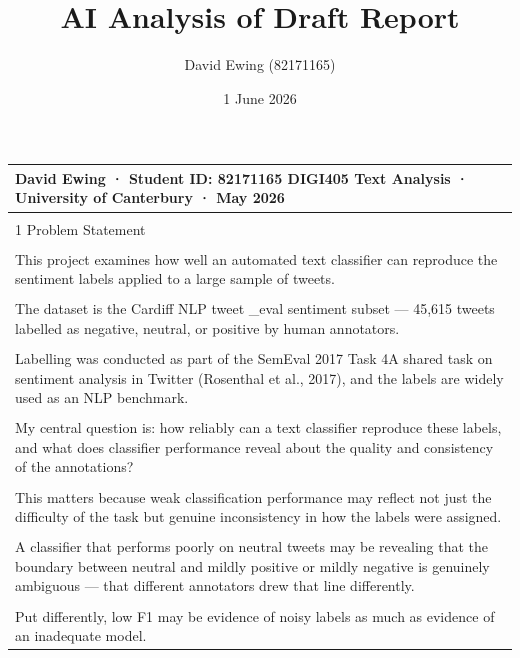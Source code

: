 \documentclass[11pt]{article}
\title{AI Analysis of Draft Report}
\author{David Ewing (82171165)}
\date{1 June 2026}
\begin{document}
\maketitle
\thispagestyle{empty}
\newpage

\begin{longtable}{|p{\dimexpr\linewidth-2\tabcolsep-2\arrayrulewidth\relax}|}
\hline
David Ewing · Student ID: 82171165 DIGI405 Text Analysis · University of Canterbury · May 2026 \\[2pt]
\hline
\rule{0pt}{3.5cm} \\
\hline
1 Problem Statement \\[2pt]
\hline
\rule{0pt}{3.5cm} \\
\hline
This project examines how well an automated text classifier can reproduce the sentiment labels applied to a large sample of tweets. \\[2pt]
\hline
\rule{0pt}{3.5cm} \\
\hline
The dataset is the Cardiff NLP tweet \_eval sentiment subset --- 45,615 tweets labelled as negative, neutral, or positive by human annotators. \\[2pt]
\hline
\rule{0pt}{3.5cm} \\
\hline
Labelling was conducted as part of the SemEval 2017 Task 4A shared task on sentiment analysis in Twitter (Rosenthal et al., 2017), and the labels are widely used as an NLP benchmark. \\[2pt]
\hline
\rule{0pt}{3.5cm} \\
\hline
My central question is: how reliably can a text classifier reproduce these labels, and what does classifier performance reveal about the quality and consistency of the annotations? \\[2pt]
\hline
\rule{0pt}{3.5cm} \\
\hline
This matters because weak classification performance may reflect not just the difficulty of the task but genuine inconsistency in how the labels were assigned. \\[2pt]
\hline
\rule{0pt}{3.5cm} \\
\hline
A classifier that performs poorly on neutral tweets may be revealing that the boundary between neutral and mildly positive or mildly negative is genuinely ambiguous --- that different annotators drew that line differently. \\[2pt]
\hline
\rule{0pt}{3.5cm} \\
\hline
Put differently, low F1 may be evidence of noisy labels as much as evidence of an inadequate model. \\[2pt]

\end{longtable}
\end{document}
